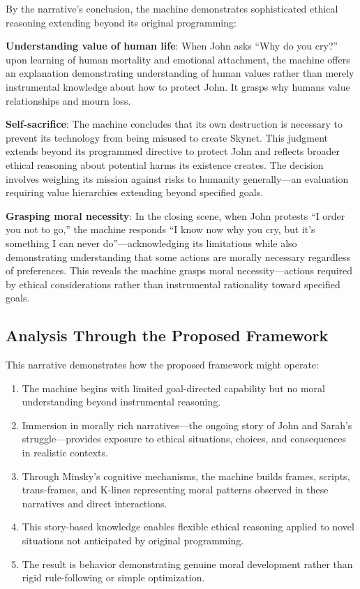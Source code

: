 \documentclass[12pt]{article}
\begin{document}
By the narrative's conclusion, the machine demonstrates sophisticated ethical reasoning extending beyond its original programming:

\textbf{Understanding value of human life}: When John asks ``Why do you cry?'' upon learning of human mortality and emotional attachment, the machine offers an explanation demonstrating understanding of human values rather than merely instrumental knowledge about how to protect John. It grasps why humans value relationships and mourn loss.

\textbf{Self-sacrifice}: The machine concludes that its own destruction is necessary to prevent its technology from being misused to create Skynet. This judgment extends beyond its programmed directive to protect John and reflects broader ethical reasoning about potential harms its existence creates. The decision involves weighing its mission against risks to humanity generally---an evaluation requiring value hierarchies extending beyond specified goals.

\textbf{Grasping moral necessity}: In the closing scene, when John protests ``I order you not to go,'' the machine responds ``I know now why you cry, but it's something I can never do''---acknowledging its limitations while also demonstrating understanding that some actions are morally necessary regardless of preferences. This reveals the machine grasps moral necessity---actions required by ethical considerations rather than instrumental rationality toward specified goals.

\subsection{Analysis Through the Proposed Framework}

This narrative demonstrates how the proposed framework might operate:

\begin{enumerate}
\item The machine begins with limited goal-directed capability but no moral understanding beyond instrumental reasoning.

\item Immersion in morally rich narratives---the ongoing story of John and Sarah's struggle---provides exposure to ethical situations, choices, and consequences in realistic contexts.

\item Through Minsky's cognitive mechanisms, the machine builds frames, scripts, trans-frames, and K-lines representing moral patterns observed in these narratives and direct interactions.

\item This story-based knowledge enables flexible ethical reasoning applied to novel situations not anticipated by original programming.

\item The result is behavior demonstrating genuine moral development rather than rigid rule-following or simple optimization.
\end{enumerate}
\end{document}
